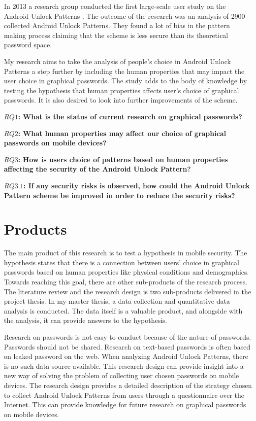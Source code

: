   In 2013 a research group conducted the first large-scale user study on the Android Unlock Patterns \cite{Uellenbeck}. The outcome of the research was an analysis of 2900 collected Android Unlock Patterns. They found a lot of bias in the pattern making process claiming that the scheme is less secure than its theoretical password space. 

  My research aims to take the analysis of people's choice in Android Unlock Patterns a step further by including the human properties that may impact the user choice in graphical passwords. The study adds to the body of knowledge by testing the hypothesis that human properties affects user's choice of graphical passwords. It is also desired to look into further improvements of the scheme. 

  {\bf $RQ1$: What is the status of current research on graphical passwords?}

  {\bf $RQ2$: What human properties may affect our choice of graphical passwords on mobile devices?}

  {\bf $RQ3$: How is users choice of patterns based on human properties affecting the security of the Android Unlock Pattern?}

  {\bf $RQ3.1$: If any security risks is observed, how could the Android Unlock Pattern scheme be improved in order to reduce the security risks?} 
  
  \section*{Products}

  The main product of this research is to test a hypothesis in mobile security. The hypothesis states that there is a connection between users' choice in graphical passwords based on human properties like physical conditions and demographics. Towards reaching this goal, there are other sub-products of the research process. The literature review and the research design is two sub-products delivered in the project thesis. In my master thesis, a data collection and quantitative data analysis is conducted. The data itself is a valuable product, and alongside with the analysis, it can provide answers to the hypothesis.

  Research on passwords is not easy to conduct because of the nature of passwords. Passwords should not be shared. Research on text-based passwords is often based on leaked password on the web. When analyzing Android Unlock Patterns, there is no such data source available. This research design can provide insight into a new way of solving the problem of collecting user chosen passwords on mobile devices. The research design provides a detailed description of the strategy chosen to collect Android Unlock Patterns from users through a questionnaire over the Internet. This can provide knowledge for future research on graphical passwords on mobile devices. 
  
